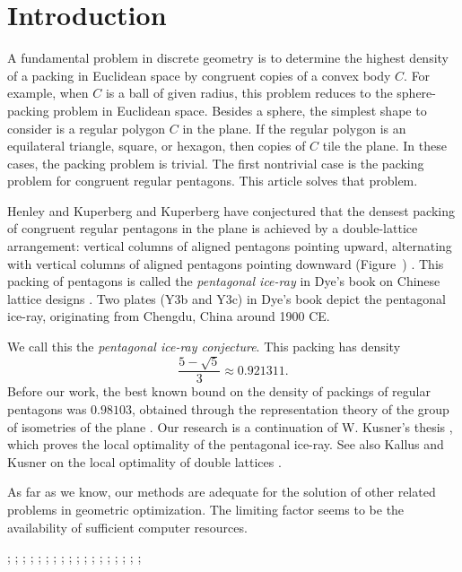\section{Introduction} 

A fundamental problem in discrete geometry is to determine the highest
density of a packing in Euclidean space by congruent copies of a
convex body $C$.  For example, when $C$ is a ball of given radius,
this problem reduces to the sphere-packing problem in Euclidean space.
Besides a sphere, the simplest shape to consider is a regular polygon
$C$ in the plane.  If the regular polygon is an equilateral
triangle, square, or hexagon, then copies of $C$ tile the plane.  In
these cases, the packing problem is trivial.  The first nontrivial
case is the packing problem for congruent regular pentagons.  This
article solves that problem.

Henley and Kuperberg and Kuperberg have conjectured that the densest
packing of congruent regular pentagons in the plane is achieved by a
double-lattice arrangement: vertical columns of aligned pentagons
pointing upward, alternating with vertical columns of aligned
pentagons pointing downward (Figure~)
\cite{Kup} \cite[p.801]{henley}.  This packing of pentagons is called
the {\it pentagonal ice-ray} in Dye's book on Chinese lattice designs
\cite{dye}.  Two plates (Y3b and Y3c) in Dye's book depict the
pentagonal ice-ray, originating from Chengdu, China around 1900 CE.

We call this the {\it pentagonal ice-ray  conjecture}.
This packing has density
\[
\frac{5 - \sqrt{5}}3 \approx 0.921311.
\] %
Before our work, the best known bound on the density of packings of
regular pentagons was $0.98103$, obtained through the representation
theory of the group of isometries of the plane \cite{val}.  Our
research is a continuation of W. Kusner's thesis \cite{Kus}, which
proves the local optimality of the pentagonal ice-ray. See also
Kallus and Kusner on the local optimality of double lattices \cite{KKlocal}.

As far as we know, our methods are adequate for the solution of other
related problems in geometric optimization.  The limiting factor seems
to be the availability of sufficient computer resources.

{
;  %
;  %
;  
;  %
; 
;  
;  
;  %
; 
;  
;  
;  %
;  %
; 
;  %
; 
;  
;   
}

